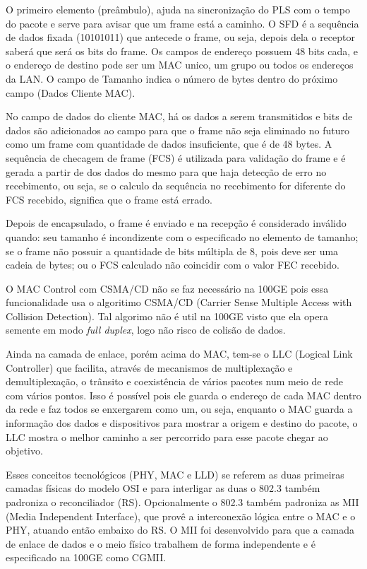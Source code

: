 \documentclass[a4paper,12pt]{article}
\begin{document}
O primeiro elemento (preâmbulo), ajuda na sincronização do PLS com o tempo do pacote e serve para avisar que um frame está a caminho. O SFD é a sequência de dados fixada (10101011) que antecede o frame, ou seja, depois dela o receptor saberá que será os bits do frame. Os campos de endereço possuem 48 bits cada, e o endereço de destino pode ser um MAC unico, um grupo ou todos os endereços da LAN. O campo de Tamanho indica o número de bytes dentro do próximo campo (Dados Cliente MAC).

No campo de dados do cliente MAC, há os dados a serem transmitidos e bits de dados são adicionados ao campo para que o frame não seja eliminado no futuro como um frame com quantidade de dados insuficiente, que é de 48 bytes. A sequência de checagem de frame (FCS) é utilizada para validação do frame e é gerada a partir de dos dados do mesmo para que haja detecção de erro no recebimento, ou seja, se o calculo da sequência no recebimento for diferente do FCS recebido, significa que o frame está errado.


Depois de encapsulado, o frame é enviado e na recepção é considerado inválido quando: seu tamanho é incondizente com o especificado no elemento de tamanho; se o frame não possuir a quantidade de bits múltipla de 8, pois deve ser uma cadeia de bytes; ou o FCS calculado não coincidir com o valor FEC recebido.

O MAC Control com CSMA/CD não se faz necessário na 100GE pois essa funcionalidade usa o algoritimo CSMA/CD (Carrier Sense Multiple Access with Collision Detection). Tal algorimo não é util na 100GE visto que ela opera semente em modo \textit{full duplex}, logo não risco de colisão de dados.

Ainda na camada de enlace, porém acima do MAC, tem-se o LLC (Logical Link Controller) que facilita, através de mecanismos de multiplexação e demultiplexação, o trânsito e coexistência de vários pacotes num meio de rede com vários pontos. Isso é possível pois ele guarda o endereço de cada MAC dentro da rede e faz todos se enxergarem como um, ou seja, enquanto o MAC guarda a informação dos dados e dispositivos para mostrar a origem e destino do pacote, o LLC mostra o melhor caminho a ser percorrido para esse pacote chegar ao objetivo.

Esses conceitos tecnológicos (PHY, MAC e LLD) se referem as duas primeiras camadas físicas do modelo OSI e para interligar as duas o 802.3 também padroniza o reconciliador (RS). Opcionalmente o 802.3 também padroniza as MII (Media Independent Interface), que provê a interconexão lógica entre o MAC e o PHY, atuando então embaixo do RS. O MII foi desenvolvido para que a camada de enlace de dados e o meio físico trabalhem de forma independente e é especificado na 100GE como CGMII.
\end{document}

